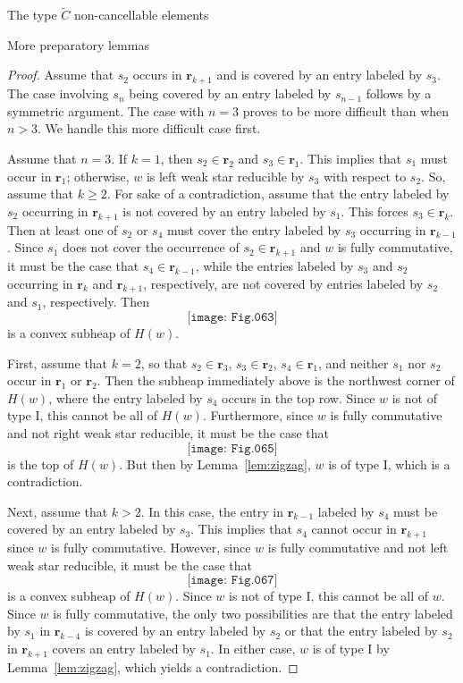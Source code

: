 \documentclass[12pt]{amsart}
\newcommand{\C}{\widetilde{C}}
\renewcommand{\(}{\left(}
\renewcommand{\)}{\right)}
\renewcommand{\r}{\mathbf{r}}
\begin{document}
\begin{section}{The type $\C$ non-cancellable elements}
\begin{subsection}{More preparatory lemmas}
\begin{proof}
Assume that $s_2$ occurs in $\r_{k+1}$ and is covered by an entry labeled by $s_3$.  The case involving $s_n$ being covered by an entry labeled by $s_{n-1}$ follows by a symmetric argument.  The case with $n=3$ proves to be more difficult than when $n>3$.  We handle this more difficult case first.

Assume that $n=3$.  If $k=1$, then $s_{2} \in \r_{2}$ and $s_{3} \in \r_{1}$.    This implies that $s_{1}$ must occur in $\r_{1}$; otherwise, $w$ is left weak star reducible by $s_{3}$ with respect to $s_{2}$.  So, assume that $k \geq 2$.  For sake of a contradiction, assume that the entry labeled by $s_{2}$ occurring in $\r_{k+1}$ is not covered by an entry labeled by $s_{1}$.  This forces $s_{3} \in \r_{k}$.  Then at least one of $s_{2}$ or $s_{4}$ must cover the entry labeled by $s_{3}$ occurring in $\r_{k-1}$.  Since $s_{1}$ does not cover the occurrence of $s_{2} \in \r_{k+1}$ and $w$ is fully commutative, it must be the case that $s_{4} \in \r_{k-1}$, while the entries labeled by $s_{3}$ and $s_{2}$ occurring in $\r_{k}$ and $\r_{k+1}$, respectively, are not covered by entries labeled by $s_{2}$ and $s_{1}$, respectively.  Then
\[
\texttt{[image: Fig.063]}
\]
is a convex subheap of $H(w)$.

First, assume that $k=2$, so that $s_{2} \in \r_{3}$, $s_{3} \in \r_{2}$, $s_{4} \in \r_{1}$, and neither $s_{1}$ nor $s_{2}$ occur in $\r_{1}$ or $\r_{2}$.  Then the subheap immediately above is the northwest corner of $H(w)$, where the entry labeled by $s_{4}$ occurs in the top row.  Since $w$ is not of type I, this cannot be all of $H(w)$.  Furthermore, since $w$ is fully commutative and not right weak star reducible, it must be the case that 
\[
\texttt{[image: Fig.065]}
\]
is the top of $H(w)$.  But then by Lemma~\ref{lem:zigzag}, $w$ is of type I, which is a contradiction.

Next, assume that $k>2$.  In this case, the entry in $\r_{k-1}$ labeled by $s_{4}$ must be covered by an entry labeled by $s_{3}$.  This implies that $s_{4}$ cannot occur in $\r_{k+1}$ since $w$ is fully commutative.  However, since $w$ is fully commutative and not left weak star reducible, it must be the case that 
\[
\texttt{[image: Fig.067]}
\]
is a convex subheap of $H(w)$.  Since $w$ is not of type I, this cannot be all of $w$.  Since $w$ is fully commutative, the only two possibilities are that the entry labeled by $s_{1}$ in $\r_{k-4}$ is covered by an entry labeled by $s_{2}$ or that the entry labeled by $s_{2}$ in $\r_{k+1}$ covers an entry labeled by $s_{1}$.  In either case, $w$ is of type I by Lemma~\ref{lem:zigzag}, which yields a contradiction.


\end{proof}
\end{subsection}
\end{section}
\end{document}
